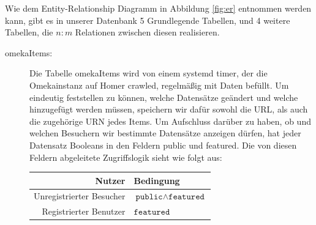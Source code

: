\documentclass{article}
\begin{document}
Wie dem Entity-Relationship Diagramm in Abbildung \ref{fig:er} entnommen werden kann,
gibt es in unserer Datenbank 5 Grundlegende Tabellen,
und 4 weitere Tabellen,
die $n:m$ Relationen zwischen diesen realisieren.

\begin{description}
\item[omekaItems:]
    Die Tabelle omekaItems wird von einem systemd timer,
    der die Omekainstanz auf Homer crawled,
    regelmäßig mit Daten befüllt.
    Um eindeutig feststellen zu können,
    welche Datensätze geändert und welche hinzugefügt werden müssen,
    speichern wir dafür sowohl die URL,
    als auch die zugehörige URN jedes Items.
    Um Aufschluss darüber zu haben,
    ob und welchen Besuchern wir bestimmte Datensätze anzeigen dürfen,
    hat jeder Datensatz Booleans in den Feldern public und featured.
    Die von diesen Feldern abgeleitete Zugriffslogik sieht wie folgt aus:

    \begin{tabular}{r|l}
    Nutzer & Bedingung\\\hline
    Unregistrierter Besucher & $\texttt{public}\land\texttt{featured}$\\
    Registrierter Benutzer & $\texttt{featured}$
    \end{tabular}


\end{description}
\end{document}
